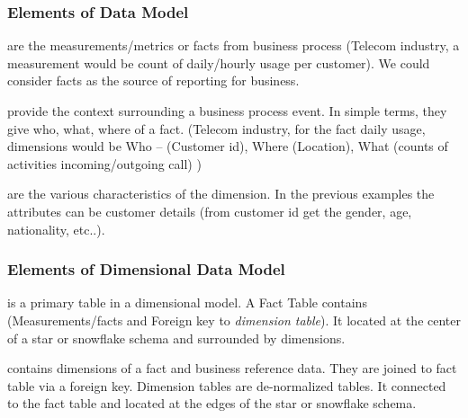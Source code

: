 \begin{frame}
    \frametitle{Elements of Data Model}
    \begin{description}[<+->]
        \item[Facts] are the measurements/metrics or facts from business process \faEdit \space \faArrowCircleORight \space (Telecom industry, a measurement would be count of daily/hourly usage per customer). We could consider facts as the source of reporting for business.
        \item[Dimensions] provide the context surrounding a business process event. In simple terms, they give who, what, where of a fact. \faEdit \space \faArrowCircleORight \space (Telecom industry, for the fact daily usage, dimensions would be Who – (Customer id), Where (Location), What (counts of activities incoming/outgoing call) )

        \item[Attributes] are the various characteristics of the dimension. In the previous examples the attributes can be customer details (from customer id get the gender, age, nationality, etc..).
    \end{description}
\end{frame}

\begin{frame}
    \frametitle{Elements of Dimensional Data Model}
    \begin{description}[<+->]
        \item[Fact Table] is a primary table in a dimensional model. A Fact Table contains (Measurements/facts and Foreign key to \textit{dimension table}). It located at the center of a star or snowflake schema and surrounded by dimensions.
        \item[Dimension table] contains dimensions of a fact and business reference data. They are joined to fact table via a foreign key. Dimension tables are de-normalized tables. It connected to the fact table and located at the edges of the star or snowflake schema.

    \end{description}
\end{frame}

